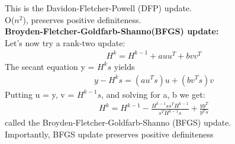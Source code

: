 \documentclass[fleqn]{article}
\begin{document}
This is the Davidon-Fletcher-Powell (DFP) update.
\\
O($n^{2}$), preserves positive definiteness.
\\
{\bf Broyden-Fletcher-Goldfarb-Shanno(BFGS) update:}
\\
Let’s now try a rank-two update:
\begin{align*}
H^{k} = H^{k-1} + auu^{T} + bvv^{T}
\end{align*}
The secant equation y = $H^{k}s$ yields
\begin{align*}
y - H^{k}s = (au^{T}s)u + (bv^{T}s)v
\end{align*}
Putting u = y, v = $H^{k-1}s$, and solving for a, b we get:
\begin{align*}
H^{k} = H^{k-1} - \frac{H^{k-1}ss^{T}H^{k-1}}{s^{T}H^{k-1}s} + \frac{yy^{T}}{y^{T}s}
\end{align*}
called the Broyden-Fletcher-Goldfarb-Shanno (BFGS) update.
\\
Importantly, BFGS update preserves positive definiteness
\end{document}
